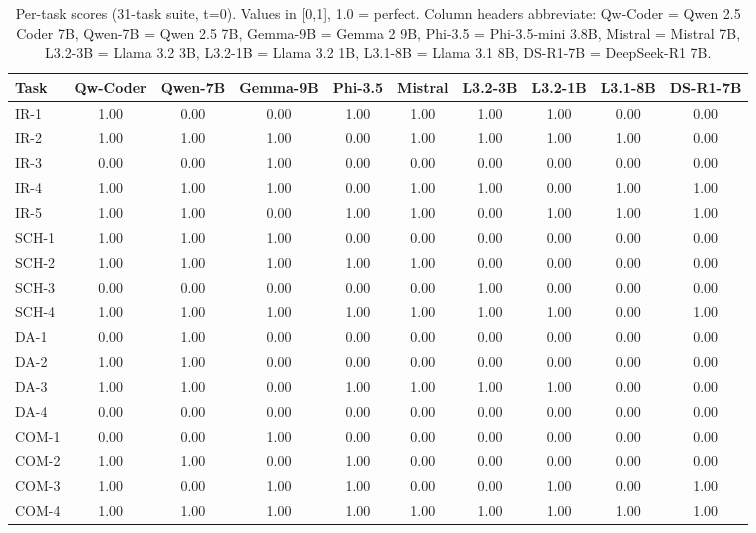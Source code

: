 \begin{table}[h]
\centering
\caption{Per-task scores (31-task suite, t=0). Values in [0,1], 1.0 = perfect. Column headers abbreviate: Qw-Coder = Qwen 2.5 Coder 7B, Qwen-7B = Qwen 2.5 7B, Gemma-9B = Gemma 2 9B, Phi-3.5 = Phi-3.5-mini 3.8B, Mistral = Mistral 7B, L3.2-3B = Llama 3.2 3B, L3.2-1B = Llama 3.2 1B, L3.1-8B = Llama 3.1 8B, DS-R1-7B = DeepSeek-R1 7B.}
\label{tab:detailed_results}
\scriptsize
\setlength{\tabcolsep}{3.5pt}
\begin{tabular}{lccccccccc}
\toprule
\textbf{Task} & \textbf{Qw-Coder} & \textbf{Qwen-7B} & \textbf{Gemma-9B} & \textbf{Phi-3.5} & \textbf{Mistral} & \textbf{L3.2-3B} & \textbf{L3.2-1B} & \textbf{L3.1-8B} & \textbf{DS-R1-7B} \\
\midrule
IR-1 & 1.00 & 0.00 & 0.00 & 1.00 & 1.00 & 1.00 & 1.00 & 0.00 & 0.00 \\
IR-2 & 1.00 & 1.00 & 1.00 & 0.00 & 1.00 & 1.00 & 1.00 & 1.00 & 0.00 \\
IR-3 & 0.00 & 0.00 & 1.00 & 0.00 & 0.00 & 0.00 & 0.00 & 0.00 & 0.00 \\
IR-4 & 1.00 & 1.00 & 1.00 & 0.00 & 1.00 & 1.00 & 0.00 & 1.00 & 1.00 \\
IR-5 & 1.00 & 1.00 & 0.00 & 1.00 & 1.00 & 0.00 & 1.00 & 1.00 & 1.00 \\
SCH-1 & 1.00 & 1.00 & 1.00 & 0.00 & 0.00 & 0.00 & 0.00 & 0.00 & 0.00 \\
SCH-2 & 1.00 & 1.00 & 1.00 & 1.00 & 1.00 & 0.00 & 0.00 & 0.00 & 0.00 \\
SCH-3 & 0.00 & 0.00 & 0.00 & 0.00 & 0.00 & 1.00 & 0.00 & 0.00 & 0.00 \\
SCH-4 & 1.00 & 1.00 & 1.00 & 1.00 & 1.00 & 1.00 & 1.00 & 0.00 & 1.00 \\
DA-1 & 0.00 & 1.00 & 0.00 & 0.00 & 0.00 & 0.00 & 0.00 & 0.00 & 0.00 \\
DA-2 & 1.00 & 1.00 & 0.00 & 0.00 & 0.00 & 0.00 & 0.00 & 0.00 & 0.00 \\
DA-3 & 1.00 & 1.00 & 0.00 & 1.00 & 1.00 & 1.00 & 1.00 & 0.00 & 0.00 \\
DA-4 & 0.00 & 0.00 & 0.00 & 0.00 & 0.00 & 0.00 & 0.00 & 0.00 & 0.00 \\
COM-1 & 0.00 & 0.00 & 1.00 & 0.00 & 0.00 & 0.00 & 0.00 & 0.00 & 0.00 \\
COM-2 & 1.00 & 1.00 & 0.00 & 1.00 & 0.00 & 0.00 & 0.00 & 0.00 & 0.00 \\
COM-3 & 1.00 & 0.00 & 1.00 & 1.00 & 0.00 & 0.00 & 1.00 & 0.00 & 1.00 \\
COM-4 & 1.00 & 1.00 & 1.00 & 1.00 & 1.00 & 1.00 & 1.00 & 1.00 & 1.00 \\

\end{tabular}
\end{table}
